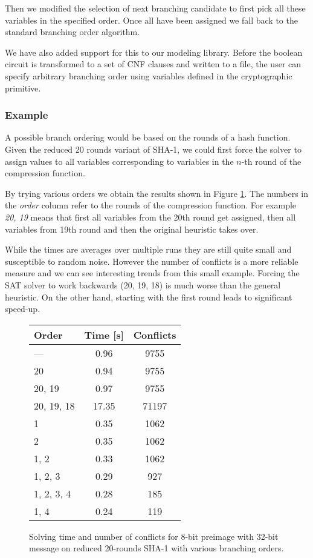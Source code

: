 
Then we modified the selection of next branching candidate to first pick all these variables in the specified order.
Once all have been assigned we fall back to the standard branching order algorithm.

We have also added support for this to our modeling library.
Before the boolean circuit is transformed to a set of CNF clauses and written to a file, the user can specify arbitrary branching order using variables defined in the cryptographic primitive.

\subsubsection{Example}
A possible branch ordering would be based on the rounds of a hash function.
Given the reduced 20 rounds variant of SHA-1, we could first force the solver to assign values to all variables corresponding to variables in the $n$-th round of the compression function.

By trying various orders we obtain the results shown in Figure \ref{fig:opt-branchorder-example-sha1}.
The numbers in the \emph{order} column refer to the rounds of the compression function.
For example \emph{20, 19} means that first all variables from the 20th round get assigned, then all variables from 19th round and then the original heuristic takes over.

While the times are averages over multiple runs they are still quite small and susceptible to random noise.
However the number of conflicts is a more reliable measure and we can see interesting trends from this small example.
Forcing the SAT solver to work backwards (20, 19, 18) is much worse than the general heuristic.
On the other hand, starting with the first round leads to significant speed-up.

\begin{figure}
\caption{Solving time and number of conflicts for 8-bit preimage with 32-bit message on reduced 20-rounds SHA-1 with various branching orders.}
\label{fig:opt-branchorder-example-sha1}
\begin{tabular}{l|c|c}
Order & Time [s] & Conflicts \\ \hline
--- & 0.96 & 9755 \\ \hline
20 & 0.94 & 9755 \\
20, 19 & 0.97 & 9755 \\
20, 19, 18 & 17.35 & 71197 \\ \hline
1 & 0.35 & 1062 \\
2 & 0.35 & 1062 \\
1, 2 & 0.33 & 1062 \\
1, 2, 3 & 0.29 & 927 \\
1, 2, 3, 4 & 0.28 & 185 \\
1, 4 & 0.24 & 119
\end{tabular}
\end{figure}

